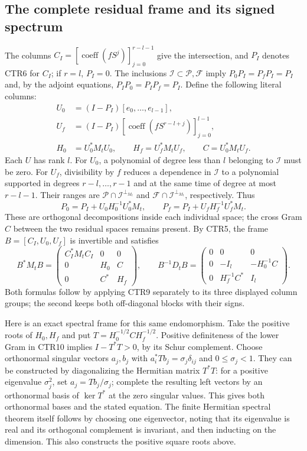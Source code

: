 \subsection{The complete residual frame and its signed spectrum}
The columns $C_I=[\operatorname{coeff}(fS^j)]_{j=0}^{r-l-1}$ give the
intersection, and $P_I$ denotes CTR6 for $C_I$; if $r=l$, $P_I=0$.
The inclusions $\mathcal I\subset\mathcal P,\mathcal F$ imply
$P_0P_I=P_fP_I=P_I$ and, by the adjoint equations,
$P_IP_0=P_IP_f=P_I$. Define the following literal columns:
\[
 \begin{split}
 U_0&=(I-P_I)[e_0,\ldots,e_{l-1}],\\
 U_f&=(I-P_I)[\operatorname{coeff}(fS^{r-l+j})]_{j=0}^{l-1},\\
 H_0&=U_0^*M_tU_0,\qquad H_f=U_f^*M_tU_f,\qquad C=U_0^*M_tU_f.
 \end{split}
 \tag{CTR8}
\]
Each $U$ has rank $l$. For $U_0$, a polynomial of degree less than $l$
belonging to $\mathcal I$ must be zero. For $U_f$, divisibility by $f$
reduces a dependence in $\mathcal I$ to a polynomial supported in degrees
$r-l,\ldots,r-1$ and at the same time of degree at most $r-l-1$.
Their ranges are $\mathcal P\cap\mathcal I^{\perp_{M_t}}$ and
$\mathcal F\cap\mathcal I^{\perp_{M_t}}$, respectively. Thus
\[
 P_0=P_I+U_0H_0^{-1}U_0^*M_t,\qquad
 P_f=P_I+U_fH_f^{-1}U_f^*M_t.
 \tag{CTR9}
\]
These are orthogonal decompositions inside each individual space; the
cross Gram $C$ between the two residual spaces remains present.
By CTR5, the frame $B=[C_I,U_0,U_f]$ is invertible and satisfies
\[
 B^*M_tB=
 \begin{pmatrix}C_I^*M_tC_I&0&0\\0&H_0&C\\0&C^*&H_f\end{pmatrix},\qquad
 B^{-1}D_tB=
 \begin{pmatrix}0&0&0\\0&-I_l&-H_0^{-1}C\\0&H_f^{-1}C^*&I_l\end{pmatrix}.
 \tag{CTR10}
\]
Both formulas follow by applying CTR9 separately to its three displayed
column groups; the second keeps both off-diagonal blocks with their signs.

Here is an exact spectral frame for this same endomorphism. Take the
positive roots of $H_0,H_f$ and put
$T=H_0^{-1/2}CH_f^{-1/2}$. Positive definiteness of the lower Gram in
CTR10 implies $I-T^*T>0$, by its Schur complement. Choose orthonormal
singular vectors $a_j,b_j$ with
$a_i^*Tb_j=\sigma_j\delta_{ij}$ and $0\leq\sigma_j<1$.
They can be constructed by diagonalizing the Hermitian matrix $T^*T$:
for a positive eigenvalue $\sigma_j^2$, set $a_j=Tb_j/\sigma_j$;
complete the resulting left vectors by an orthonormal basis of
$\ker T^*$ at the zero singular values. This gives both orthonormal
bases and the stated equation. The finite Hermitian spectral theorem
itself follows by choosing one eigenvector, noting that its eigenvalue
is real and its orthogonal complement is invariant, and then inducting
on the dimension. This also constructs the positive square roots above.

